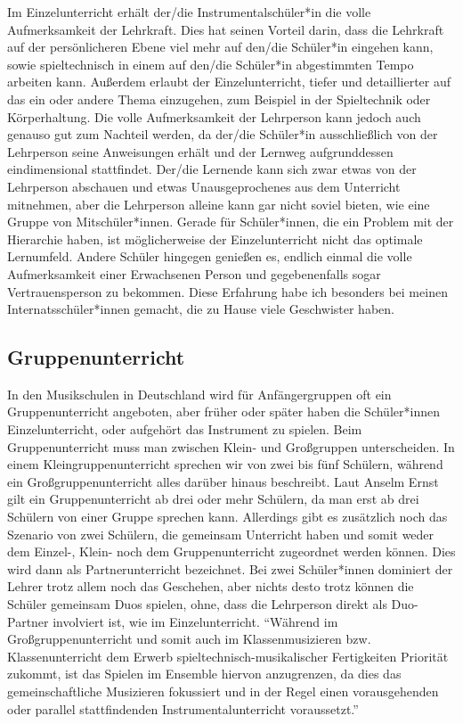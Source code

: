 Im Einzelunterricht erhält der/die Instrumentalschüler*in die
volle Aufmerksamkeit der Lehrkraft. Dies hat seinen Vorteil darin, dass die
Lehrkraft auf der persönlicheren Ebene viel mehr auf den/die Schüler*in eingehen
kann, sowie spieltechnisch in einem auf den/die Schüler*in abgestimmten Tempo
arbeiten kann. Außerdem erlaubt der Einzelunterricht, tiefer und detaillierter
auf das ein oder andere Thema einzugehen, zum Beispiel in der Spieltechnik oder
Körperhaltung. Die volle Aufmerksamkeit der Lehrperson kann jedoch auch genauso
gut zum Nachteil werden, da der/die Schüler*in ausschließlich von der Lehrperson
seine Anweisungen erhält und der Lernweg aufgrunddessen eindimensional
stattfindet. Der/die Lernende kann sich zwar etwas von der Lehrperson abschauen
und etwas Unausgeprochenes aus dem Unterricht mitnehmen, aber die Lehrperson
alleine kann gar nicht soviel bieten, wie eine Gruppe von Mitschüler*innen.
Gerade für Schüler*innen, die ein Problem mit der Hierarchie haben, ist
möglicherweise der Einzelunterricht nicht das optimale Lernumfeld. Andere
Schüler hingegen genießen es, endlich einmal die volle Aufmerksamkeit einer
Erwachsenen Person und gegebenenfalls sogar Vertrauensperson zu bekommen. Diese
Erfahrung habe ich besonders bei meinen Internatsschüler*innen gemacht, die zu
Hause viele Geschwister haben. 



\subsection{Gruppenunterricht}

In den Musikschulen in Deutschland wird für Anfängergruppen oft ein
Gruppenunterricht angeboten, aber früher oder später haben
die Schüler*innen Einzelunterricht, oder aufgehört das Instrument zu spielen.
Beim Gruppenunterricht muss man zwischen Klein- und Großgruppen unterscheiden.
In einem Kleingruppenunterricht sprechen wir von zwei bis fünf Schülern, während
ein Großgruppenunterricht alles darüber hinaus beschreibt.
\autocite[219]{busch:grundwissen_instrumentalpaedagogik} Laut Anselm Ernst gilt
ein Gruppenunterricht ab drei oder mehr Schülern, da man erst ab drei Schülern
von einer Gruppe sprechen kann.
\autocite[79]{ernst:die_zukunftsfaehige_musikschule}
Allerdings gibt es zusätzlich noch das Szenario von zwei Schülern, die gemeinsam
Unterricht haben und somit weder dem Einzel-, Klein- noch dem Gruppenunterricht
zugeordnet werden können. Dies wird dann als Partnerunterricht bezeichnet.
\autocite[219]{busch:grundwissen_instrumentalpaedagogik} Bei zwei Schüler*innen
dominiert der Lehrer trotz allem noch das Geschehen, aber nichts desto trotz
können die Schüler gemeinsam Duos spielen, ohne, dass die Lehrperson direkt als
Duo-Partner involviert ist, wie im Einzelunterricht. \enquote{Während im
Großgruppenunterricht und somit auch im Klassenmusizieren bzw. Klassenunterricht
dem Erwerb spieltechnisch-musikalischer Fertigkeiten Priorität zukommt, ist das
Spielen im Ensemble hiervon anzugrenzen, da dies das gemeinschaftliche
Musizieren fokussiert und in der Regel einen vorausgehenden oder parallel
stattfindenden Instrumentalunterricht
voraussetzt.}\autocite[219]{busch:grundwissen_instrumentalpaedagogik}

